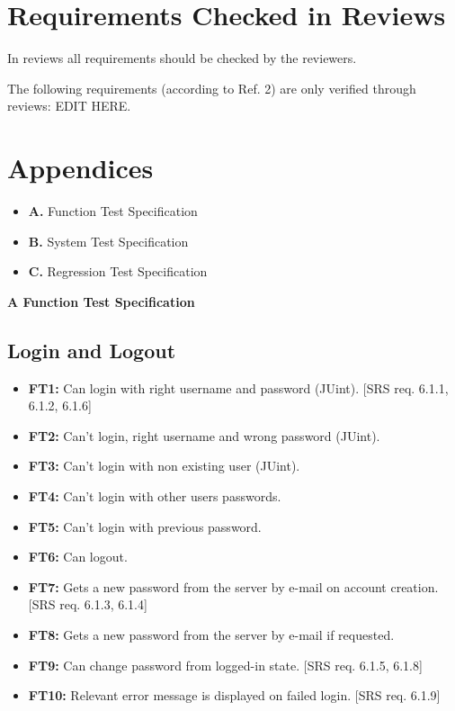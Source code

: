 \documentclass{article}
\begin{document}
\section{Requirements Checked in Reviews}
In reviews all requirements should be checked by the reviewers.

The following requirements (according to Ref. 2) are only verified through
reviews: EDIT HERE.


\section{Appendices}
	\begin{itemize}
		\item \textbf{A.} Function Test Specification 
		\item \textbf{B.} System Test Specification 	
		\item \textbf{C.} Regression Test Specification 
		\end{itemize}
	
	\newpage
		\begin{flushleft}
		{\large \textbf{A Function Test Specification}}
		\end{flushleft}
		
		\subsection{Login and Logout}
		
		\begin{itemize}
  			\item \textbf{FT1:} Can login with right username and password (JUint). [SRS req. 6.1.1, 6.1.2, 6.1.6]	
	
			\item \textbf{FT2:} Can't login, right username and wrong password (JUint).
			
			\item \textbf{FT3:} Can't login with non existing user (JUint).
			
			\item \textbf{FT4:} Can't login with other users passwords. 
			
			\item \textbf{FT5:} Can't login with previous password.
				
			\item \textbf{FT6:} Can logout. 

  			\item \textbf{FT7:} Gets a new password from the server by e-mail on account creation. [SRS req. 6.1.3, 6.1.4]
  			
  			\item \textbf{FT8:} Gets a new password from the server by e-mail if requested.

  			\item \textbf{FT9:} Can change password from logged-in state. [SRS req. 6.1.5, 6.1.8]

  			\item \textbf{FT10:} Relevant error message is displayed on failed login. [SRS req. 6.1.9] 
		\end{itemize}
		
\end{document}
